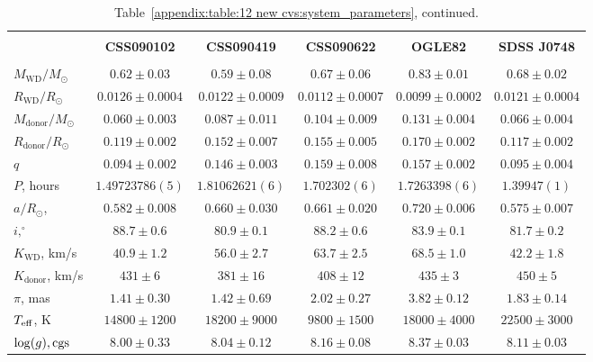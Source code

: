\begin{landscape}
    \begin{table}
        \centering
        \caption{Table~\ref{appendix:table:12 new cvs:system_parameters}, continued.}
        \label{appendix:table:12 new cvs:system_parameters cont 1}
        \begin{tabular}{lccccc}
            \hline \\
            ~                          & \textbf{CSS090102}     & \textbf{CSS090419}    & \textbf{CSS090622}    & \textbf{OGLE82}   & \textbf{SDSS J0748} \\
            \hline \hline \\
            $M_\mathrm{WD}/M_\odot$    & $0.62\pm0.03$          & $0.59\pm0.08$         & $0.67\pm0.06$         & $0.83\pm0.01$     & $0.68\pm0.02$ \\
            $R_\mathrm{WD}/R_\odot$    & $0.0126\pm0.0004$      & $0.0122\pm0.0009$     & $0.0112\pm0.0007$     & $0.0099\pm0.0002$ & $0.0121\pm0.0004$ \\
            $M_\mathrm{donor}/M_\odot$ & $0.060\pm0.003$        & $0.087\pm0.011$       & $0.104\pm0.009$       & $0.131\pm0.004$   & $0.066\pm0.004$ \\
            $R_\mathrm{donor}/R_\odot$ & $0.119\pm0.002$        & $0.152\pm0.007$       & $0.155\pm0.005$       & $0.170\pm0.002$   & $0.117\pm0.002$ \\
            $q$                        & $0.094\pm0.002$        & $0.146\pm0.003$       & $0.159\pm0.008$       & $0.157\pm0.002$   & $0.095\pm0.004$ \\
            \hline
            $P$, hours                 & $1.49723786(5)$        & $1.81062621(6)$       & $1.702302(6)$         & $1.7263398(6)$    & $1.39947(1)$ \\
            $a/R_\odot$,               & $0.582\pm0.008$        & $0.660\pm0.030$       & $0.661\pm0.020$       & $0.720\pm0.006$   & $0.575\pm0.007$ \\
            $i, ^\circ$                & $88.7\pm0.6$           & $80.9\pm0.1$          & $88.2\pm0.6$          & $83.9\pm0.1$      & $81.7\pm0.2$ \\
            $K_\mathrm{WD}$, km/s      & $40.9\pm1.2$           & $56.0\pm2.7$          & $63.7\pm2.5$          & $68.5\pm1.0$      & $42.2\pm1.8$ \\
            $K_\mathrm{donor}$, km/s   & $431\pm6$              & $381\pm16$            & $408\pm12$            & $435\pm3$         & $450\pm5$ \\
            \hline
            $\pi$, mas                 & $1.41\pm0.30$          & $1.42\pm0.69$         & $2.02\pm0.27$         & $3.82\pm0.12$     & $1.83\pm0.14$ \\
            $T_{\rm eff}$, K           & $14800\pm1200$         & $18200\pm9000$        & $9800\pm1500$         & $18000\pm4000$    & $22500\pm3000$ \\
            $\log(g), {\rm cgs}$       & $8.00\pm0.33$          & $8.04\pm0.12$         & $8.16\pm0.08$         & $8.37\pm0.03$     & $8.11\pm0.03$ \\
            \hline
            \hline
        \end{tabular}
    \end{table}


\end{landscape}
